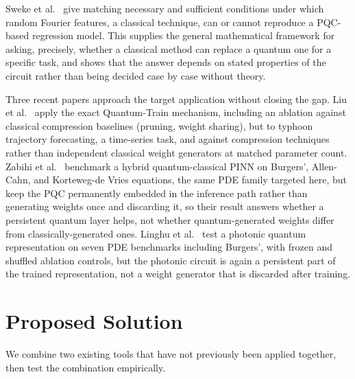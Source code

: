 \documentclass[10pt,a4paper]{article}
\begin{document}
Sweke et al.\ \cite{sweke2025} give matching necessary and sufficient conditions under which random Fourier features, a classical technique, can or cannot reproduce a PQC-based regression model. This supplies the general mathematical framework for asking, precisely, whether a classical method can replace a quantum one for a specific task, and shows that the answer depends on stated properties of the circuit rather than being decided case by case without theory.

Three recent papers approach the target application without closing the gap. Liu et al.\ \cite{liu2025typhoon} apply the exact Quantum-Train mechanism, including an ablation against classical compression baselines (pruning, weight sharing), but to typhoon trajectory forecasting, a time-series task, and against compression techniques rather than independent classical weight generators at matched parameter count. Zabihi et al.\ \cite{zabihi2026} benchmark a hybrid quantum-classical PINN on Burgers', Allen-Cahn, and Korteweg-de Vries equations, the same PDE family targeted here, but keep the PQC permanently embedded in the inference path rather than generating weights once and discarding it, so their result answers whether a persistent quantum layer helps, not whether quantum-generated weights differ from classically-generated ones. Linghu et al.\ \cite{linghu2026} test a photonic quantum representation on seven PDE benchmarks including Burgers', with frozen and shuffled ablation controls, but the photonic circuit is again a persistent part of the trained representation, not a weight generator that is discarded after training.

\section{Proposed Solution}

We combine two existing tools that have not previously been applied together, then test the combination empirically.
\end{document}
